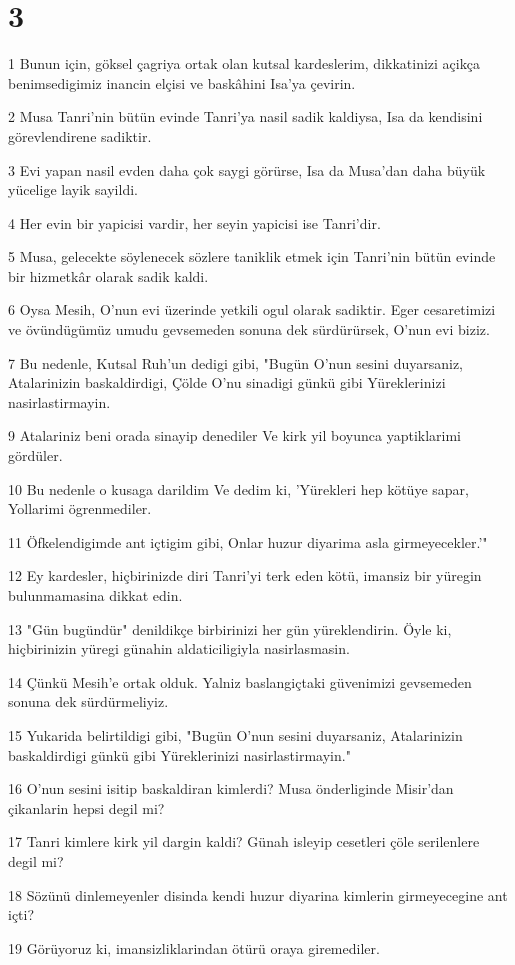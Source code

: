 \chapter{3}

\par 1 Bunun için, göksel çagriya ortak olan kutsal kardeslerim, dikkatinizi açikça benimsedigimiz inancin elçisi ve baskâhini Isa'ya çevirin.
\par 2 Musa Tanri'nin bütün evinde Tanri'ya nasil sadik kaldiysa, Isa da kendisini görevlendirene sadiktir.
\par 3 Evi yapan nasil evden daha çok saygi görürse, Isa da Musa'dan daha büyük yücelige layik sayildi.
\par 4 Her evin bir yapicisi vardir, her seyin yapicisi ise Tanri'dir.
\par 5 Musa, gelecekte söylenecek sözlere taniklik etmek için Tanri'nin bütün evinde bir hizmetkâr olarak sadik kaldi.
\par 6 Oysa Mesih, O'nun evi üzerinde yetkili ogul olarak sadiktir. Eger cesaretimizi ve övündügümüz umudu gevsemeden sonuna dek sürdürürsek, O'nun evi biziz.
\par 7 Bu nedenle, Kutsal Ruh'un dedigi gibi, "Bugün O'nun sesini duyarsaniz, Atalarinizin baskaldirdigi, Çölde O'nu sinadigi günkü gibi Yüreklerinizi nasirlastirmayin.
\par 9 Atalariniz beni orada sinayip denediler Ve kirk yil boyunca yaptiklarimi gördüler.
\par 10 Bu nedenle o kusaga darildim Ve dedim ki, 'Yürekleri hep kötüye sapar, Yollarimi ögrenmediler.
\par 11 Öfkelendigimde ant içtigim gibi, Onlar huzur diyarima asla girmeyecekler.'"
\par 12 Ey kardesler, hiçbirinizde diri Tanri'yi terk eden kötü, imansiz bir yüregin bulunmamasina dikkat edin.
\par 13 "Gün bugündür" denildikçe birbirinizi her gün yüreklendirin. Öyle ki, hiçbirinizin yüregi günahin aldaticiligiyla nasirlasmasin.
\par 14 Çünkü Mesih'e ortak olduk. Yalniz baslangiçtaki güvenimizi gevsemeden sonuna dek sürdürmeliyiz.
\par 15 Yukarida belirtildigi gibi, "Bugün O'nun sesini duyarsaniz, Atalarinizin baskaldirdigi günkü gibi Yüreklerinizi nasirlastirmayin."
\par 16 O'nun sesini isitip baskaldiran kimlerdi? Musa önderliginde Misir'dan çikanlarin hepsi degil mi?
\par 17 Tanri kimlere kirk yil dargin kaldi? Günah isleyip cesetleri çöle serilenlere degil mi?
\par 18 Sözünü dinlemeyenler disinda kendi huzur diyarina kimlerin girmeyecegine ant içti?
\par 19 Görüyoruz ki, imansizliklarindan ötürü oraya giremediler.

